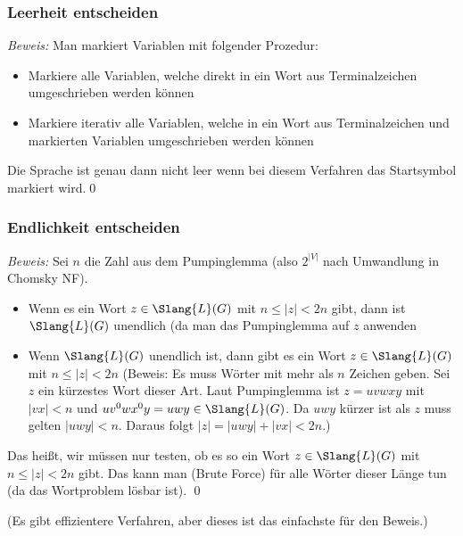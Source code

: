 \documentclass[aspectratio=1610,onlymath]{beamer}
\begin{document}
\begin{frame}\frametitle{Leerheit entscheiden}


\emph{Beweis:} Man markiert Variablen mit folgender Prozedur:
\begin{itemize}
\item Markiere alle Variablen, welche direkt in ein Wort aus Terminalzeichen umgeschrieben werden können
\item Markiere iterativ alle Variablen, welche in ein Wort aus Terminalzeichen und markierten Variablen umgeschrieben werden können
\end{itemize}
Die Sprache ist genau dann nicht leer wenn bei diesem Verfahren das Startsymbol markiert wird.\qed

\end{frame}

\begin{frame}\frametitle{Endlichkeit entscheiden}

\pause

\emph{Beweis:} Sei $n$ die Zahl aus dem Pumpinglemma (also $2^{|V|}$ nach Umwandlung in Chomsky NF).\pause
\begin{itemize}
\item Wenn es ein Wort $z\in\Slang{L}(G)$ mit $n\leq|z|<2n$ gibt, dann ist $\Slang{L}(G)$
unendlich (da man das Pumpinglemma auf $z$ anwenden  \pause
\item Wenn $\Slang{L}(G)$ unendlich ist, dann gibt es ein Wort $z\in\Slang{L}(G)$ mit $n\leq|z|<2n$ \pause
(Beweis: Es muss Wörter mit mehr als $n$ Zeichen geben. \pause Sei $z$ ein kürzestes Wort dieser Art. \pause
Laut Pumpinglemma ist $z=uvwxy$ mit $|vx|<n$ und $uv^0wx^0y=uwy\in\Slang{L}(G)$. \pause Da $uwy$ kürzer ist als $z$
muss gelten $|uwy|<n$. \pause Daraus folgt $|z|=|uwy|+|vx|<2n$.)\pause
\end{itemize}
Das heißt, wir müssen nur testen, ob es so ein Wort $z\in\Slang{L}(G)$ mit $n\leq|z|<2n$ gibt.
Das kann man (Brute Force) für alle Wörter dieser Länge tun (da das Wortproblem lösbar ist). \qed

{\tiny(Es gibt effizientere Verfahren, aber dieses ist das einfachste für den Beweis.)}

\end{frame}
\end{document}
